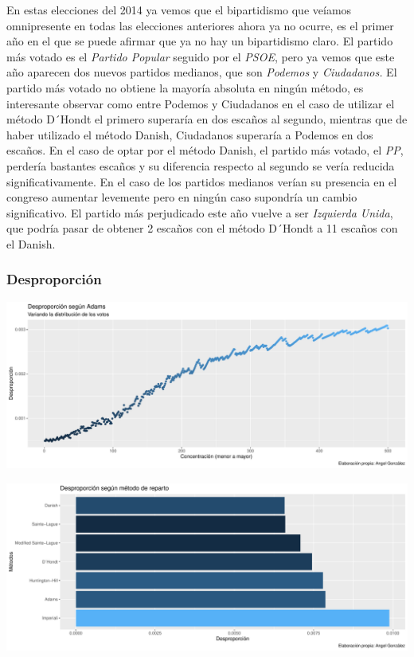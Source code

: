 \documentclass[12pt,a4paper,]{book}
\numberwithin{dummy}{section}
\theoremstyle{ocrenumbox}
\theoremstyle{blacknumex}
\theoremstyle{blacknumbox}
\theoremstyle{ocrenum}
\theoremstyle{ocrenum}
\begin{document}
En estas elecciones del 2014 ya vemos que el bipartidismo que veíamos
omnipresente en todas las elecciones anteriores ahora ya no ocurre, es
el primer año en el que se puede afirmar que ya no hay un bipartidismo
claro. El partido más votado es el \emph{Partido Popular} seguido por el
\emph{PSOE}, pero ya vemos que este año aparecen dos nuevos partidos
medianos, que son \emph{Podemos} y \emph{Ciudadanos.} El partido más
votado no obtiene la mayoría absoluta en ningún método, es interesante
observar como entre Podemos y Ciudadanos en el caso de utilizar el
método D´Hondt el primero superaría en dos escaños al segundo, mientras
que de haber utilizado el método Danish, Ciudadanos superaría a Podemos
en dos escaños. En el caso de optar por el método Danish, el partido más
votado, el \emph{PP}, perdería bastantes escaños y su diferencia
respecto al segundo se vería reducida significativamente. En el caso de
los partidos medianos verían su presencia en el congreso aumentar
levemente pero en ningún caso supondría un cambio significativo. El
partido más perjudicado este año vuelve a ser \emph{Izquierda Unida},
que podría pasar de obtener 2 escaños con el método D´Hondt a 11 escaños
con el Danish.

\hypertarget{desproporciuxf3n-11}{%
\subsubsection{Desproporción}\label{desproporciuxf3n-11}}

\begin{center}\includegraphics[width=1\linewidth]{figurasR/unnamed-chunk-39-1} \end{center}

\begin{center}\includegraphics[width=1\linewidth]{figurasR/unnamed-chunk-39-2} \end{center}
\end{document}
